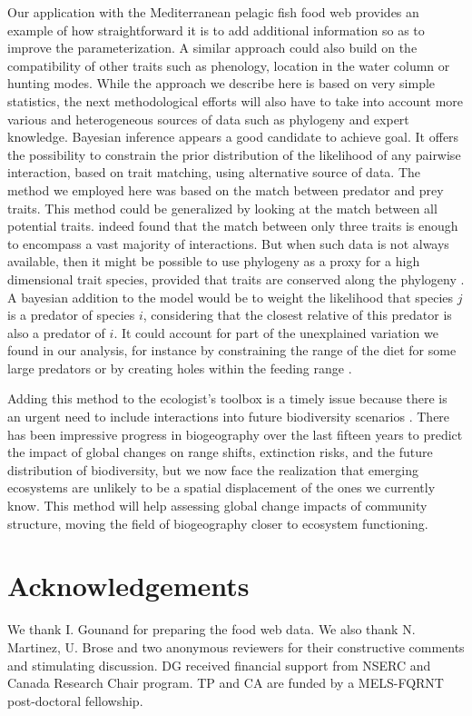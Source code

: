 \documentclass[12pt]{article}
\begin{document}
Our application with the Mediterranean pelagic fish food web provides an example
of how straightforward it is to add additional information so as to improve the
parameterization. A similar approach could also build on the compatibility of
other traits such as phenology, location in the water column or hunting modes.
While the approach we describe here is based on very simple statistics, the next
methodological efforts will also have to take into account more various and
heterogeneous sources of data such as phylogeny \parencite{Eklof2012} and expert
knowledge. Bayesian inference appears a good candidate to achieve goal. It
offers the possibility to constrain the prior distribution of the likelihood of
any pairwise interaction, based on trait matching, using alternative source of
data. The method we employed here was based on the match between predator and
prey traits. This method could be generalized by looking at the match between
all potential traits. \textcite{Eklof2013} indeed found that the match between
only three traits is enough to encompass a vast majority of interactions. But
when such data is not always available, then it might be possible to use
phylogeny as a proxy for a high dimensional trait species, provided that traits
are conserved along the phylogeny \parencite{Mouquet2012}. A bayesian addition
to the model would be to weight the likelihood that species $j$ is a predator of
species $i$, considering that the closest relative of this predator is also a
predator of $i$. It could account for part of the unexplained variation we found
in our analysis, for instance by constraining the range of the diet for some
large predators or by creating holes within the feeding range
\parencite{Rall2011}.

Adding this method to the ecologist's toolbox is a timely issue because there is
an urgent need to include interactions into future biodiversity scenarios
\parencite{Thuiller2013}. There has been impressive progress in biogeography
over the last fifteen years to predict the impact of global changes on range
shifts, extinction risks, and the future distribution of biodiversity, but we
now face the realization that emerging ecosystems are unlikely to be a spatial
displacement of the ones we currently know. This method will help assessing
global change impacts of community structure, moving the field of biogeography
closer to ecosystem functioning.

\section{Acknowledgements}
We thank I. Gounand for preparing the food web data. We also thank N. Martinez,
U. Brose and two anonymous reviewers for their constructive comments and
stimulating discussion. DG received financial support from NSERC and Canada
Research Chair program. TP and CA are funded by a MELS-FQRNT post-doctoral fellowship.
\newpage
\end{document}
